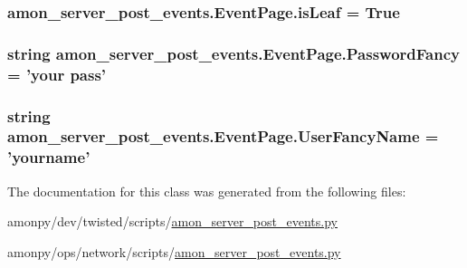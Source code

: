 \hypertarget{classamon__server__post__events_1_1_event_page_a2867e0aa66087e101805e8598c4a6fbc}{
\subsubsection[{is\-Leaf}]{\setlength{\rightskip}{0pt plus 5cm}amon\-\_\-server\-\_\-post\-\_\-events.\-Event\-Page.\-is\-Leaf = True\hspace{0.3cm}{\ttfamily [static]}}}\label{classamon__server__post__events_1_1_event_page_a2867e0aa66087e101805e8598c4a6fbc}
\hypertarget{classamon__server__post__events_1_1_event_page_a6cedf6892b5526dd3d44c0d859ff1d05}{
\subsubsection[{Password\-Fancy}]{\setlength{\rightskip}{0pt plus 5cm}string amon\-\_\-server\-\_\-post\-\_\-events.\-Event\-Page.\-Password\-Fancy = 'your pass'\hspace{0.3cm}{\ttfamily [static]}}}\label{classamon__server__post__events_1_1_event_page_a6cedf6892b5526dd3d44c0d859ff1d05}
\hypertarget{classamon__server__post__events_1_1_event_page_adbabe10502f40f6fb8562017ca3b332a}{
\subsubsection[{User\-Fancy\-Name}]{\setlength{\rightskip}{0pt plus 5cm}string amon\-\_\-server\-\_\-post\-\_\-events.\-Event\-Page.\-User\-Fancy\-Name = 'yourname'\hspace{0.3cm}{\ttfamily [static]}}}\label{classamon__server__post__events_1_1_event_page_adbabe10502f40f6fb8562017ca3b332a}


The documentation for this class was generated from the following files\-:\begin{DoxyCompactItemize}
\item 
amonpy/dev/twisted/scripts/\hyperlink{dev_2twisted_2scripts_2amon__server__post__events_8py}{amon\-\_\-server\-\_\-post\-\_\-events.\-py}\item 
amonpy/ops/network/scripts/\hyperlink{ops_2network_2scripts_2amon__server__post__events_8py}{amon\-\_\-server\-\_\-post\-\_\-events.\-py}\end{DoxyCompactItemize}
